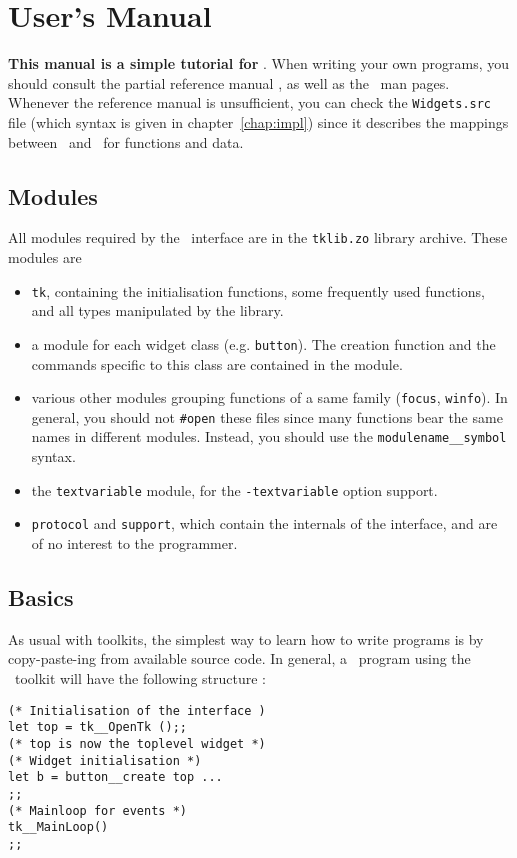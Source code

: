 \chapter{User's Manual}
{\bf This manual is a simple tutorial for \caml\tk}.  When writing your own
programs, you should consult the partial reference manual , as well as the
\tk\ man pages.  Whenever the reference manual is unsufficient, you can
check the \verb|Widgets.src| file (which syntax is given in
chapter~\ref{chap:impl}) since it describes the mappings between
\tk\ and \caml\ for functions and data. 

\section{Modules}
All modules required by the \tk\ interface are in the \verb|tklib.zo| 
library archive. These modules are
\begin{itemize}
\item \verb|tk|, containing the initialisation functions, some frequently
used functions, and all types manipulated by the library.

\item a module for each widget class (e.g. \verb|button|). The creation
function and the commands specific to this class are contained in the
module.

\item various other modules grouping functions of a same family
(\verb|focus|, \verb|winfo|). In general, you should not \verb|#open| these
files since many functions bear the same names in different modules.
Instead, you should use the \verb|modulename__symbol| syntax.

\item the \verb|textvariable| module, for the \verb|-textvariable| option
support.

\item \verb|protocol| and \verb|support|, which contain the internals
of the interface, and are of no interest to the programmer.
\end{itemize} 

\section{Basics}
As usual with toolkits, the simplest way to learn how to write programs is
by copy-paste-ing from available source code. In general, a \caml\ program
using the \tk\ toolkit will have the following structure :
\begin{verbatim}
(* Initialisation of the interface )
let top = tk__OpenTk ();;
(* top is now the toplevel widget *)
(* Widget initialisation *)
let b = button__create top ...
;;
(* Mainloop for events *)
tk__MainLoop()
;;
\end{verbatim} 

